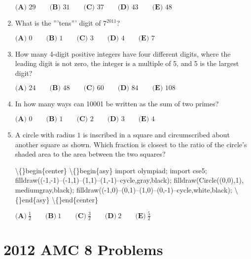 \documentclass{article}
\begin{document}
\begin{enumerate}[label=\arabic*., itemsep=0.5em]
\( \textbf{(A) }29\qquad\textbf{(B) }31\qquad\textbf{(C) }37\qquad\textbf{(D) }43\qquad\textbf{(E) }48 \)\par \vspace{0.5em}\item What is the '''tens''' digit of \(7^{2011}\)?

\( \textbf{(A) }0\qquad\textbf{(B) }1\qquad\textbf{(C) }3\qquad\textbf{(D) }4\qquad\textbf{(E) }7 \)\par \vspace{0.5em}\item How many 4-digit positive integers have four different digits, where the leading digit is not zero, the integer is a multiple of 5, and 5 is the largest digit?

\( \textbf{(A) }24\qquad\textbf{(B) }48\qquad\textbf{(C) }60\qquad\textbf{(D) }84\qquad\textbf{(E) }108 \)\par \vspace{0.5em}\item In how many ways can 10001 be written as the sum of two primes?

\( \textbf{(A) }0\qquad\textbf{(B) }1\qquad\textbf{(C) }2\qquad\textbf{(D) }3\qquad\textbf{(E) }4 \)\par \vspace{0.5em}\item A circle with radius \(1\) is inscribed in a square and circumscribed about another square as shown. Which fraction is closest to the ratio of the circle's shaded area to the area between the two squares?


\textbackslash\{\}begin\{center\}
\textbackslash\{\}begin\{asy\}
import olympiad;
import cse5;
filldraw((-1,-1)--(-1,1)--(1,1)--(1,-1)--cycle,gray,black);
filldraw(Circle((0,0),1), mediumgray,black);
filldraw((-1,0)--(0,1)--(1,0)--(0,-1)--cycle,white,black);
\textbackslash\{\}end\{asy\}
\textbackslash\{\}end\{center\}


\( \textbf{(A)}\ \frac{1}2\qquad\textbf{(B)}\ 1\qquad\textbf{(C)}\ \frac{3}2\qquad\textbf{(D)}\ 2\qquad\textbf{(E)}\ \frac{5}2 \)\par \vspace{0.5em}\end{enumerate}\newpage\section*{2012 AMC 8 Problems}
\end{document}
